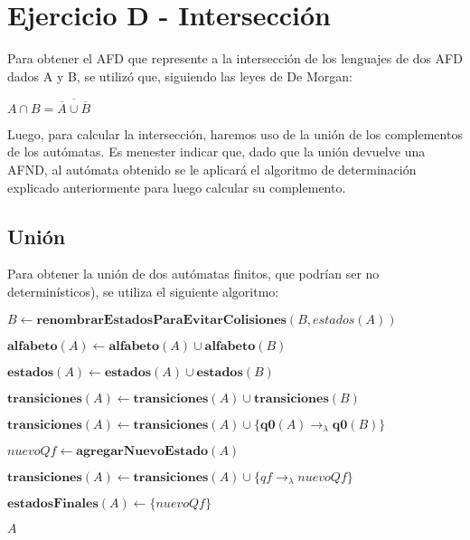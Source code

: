 \section{Ejercicio D - Intersección}

\indent \indent Para obtener el AFD que represente a la intersección de los lenguajes de dos AFD dados A y B, se utilizó que, siguiendo las leyes de De Morgan:\\
\begin{center}
$A \cap B = \overline{\overline{A} \cup \overline{B}}$
\end{center}

\indent Luego, para calcular la intersección, haremos uso de la unión de los complementos de los autómatas. Es menester indicar que, dado que la unión devuelve una AFND, al autómata obtenido se le aplicará el algoritmo de determinación explicado anteriormente para luego calcular su complemento.\\

\subsection{Unión}

\indent \indent Para obtener la unión de dos autómatas finitos, que podrían ser no determinísticos), se utiliza el siguiente algoritmo:\\

\begin{algorithm}
\begin{algorithmic}[1]

    \State $B \gets \textbf{renombrarEstadosParaEvitarColisiones}(B, estados(A)) $

    \State $\textbf{alfabeto}(A) \gets \textbf{alfabeto}(A) \cup \textbf{alfabeto}(B)$

    \State $\textbf{estados}(A) \gets \textbf{estados}(A) \cup \textbf{estados}(B)$

    \State $\textbf{transiciones}(A) \gets \textbf{transiciones}(A) \cup \textbf{transiciones}(B)$

    \State $\textbf{transiciones}(A) \gets \textbf{transiciones}(A) \cup \{\textbf{q0}(A) \rightarrow_{\lambda} \textbf{q0}(B)\}$

    \State $nuevoQf \gets \textbf{agregarNuevoEstado}(A)$


      \State $\textbf{transiciones}(A) \gets \textbf{transiciones}(A) \cup \{qf \rightarrow_{\lambda} nuevoQf\}$
    \EndFor

    \State $\textbf{estadosFinales}(A) \gets \{nuevoQf\}$

    \State \Return $A$
  \EndFunction
\end{algorithmic}
\end{algorithm}
